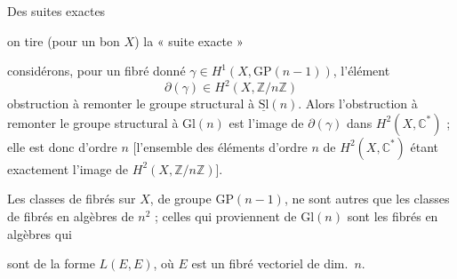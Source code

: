 \documentclass[11pt,a4paper]{article}
\begin{document}
Des \struck{\ill{}}  suites exactes


on tire (pour un bon $X$) la « suite exacte »



considérons, pour un fibré donné $\gamma \in H^1(X, \mathrm{GP}(n-1))$,
l'élément
\[
  \partial(\gamma) \in H^2(X, \mathbb{Z}/n\mathbb{Z})
\]
obstruction à remonter le groupe structural à $\underline{\mathrm{Sl}}(n)$.
Alors l'obstruction à remonter le groupe structural à $\mathrm{Gl}(n)$ est
l'image de $\partial(\gamma)$ dans $H^2(X, \mathbb{C}^{*})$ ; elle est donc
d'ordre $n$ [l'ensemble des éléments d'ordre $n$ de $H^2(X, \mathbb{C}^{*})$
étant exactement l'image de $H^2(X, \mathbb{Z}/n\mathbb{Z})$].

Les classes de fibrés sur $X$, de groupe $\mathrm{GP}(n-1)$, ne sont autres
que les classes de fibrés en algèbres \struck{\ill{}} de \struck{\ill{}}
 $n^2$ ; celles qui proviennent de $\mathrm{Gl}(n)$ sont les fibrés
en algèbres qui


sont de la forme $L(E, E)$, où $E$ est un fibré vectoriel de dim.\ $n$.
\end{document}
